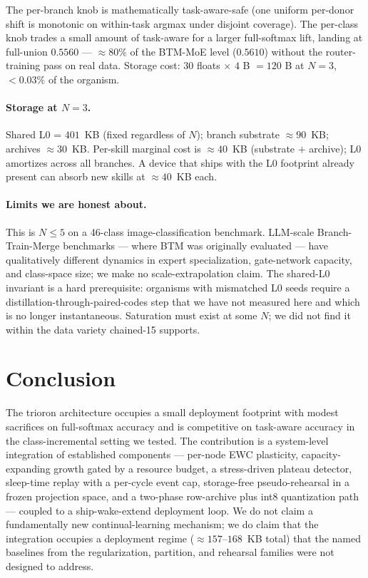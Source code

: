 \documentclass[11pt]{article}
\begin{document}
The per-branch knob is mathematically task-aware-safe (one uniform
per-donor shift is monotonic on within-task argmax under disjoint
coverage). The per-class knob trades a small amount of task-aware for
a larger full-softmax lift, landing at full-union $0.5560$ ---
$\approx 80\%$ of the BTM-MoE level ($0.5610$) without the
router-training pass on real data. Storage cost: $30$ floats $\times$
$4$ B $= 120$ B at $N = 3$, $<\!0.03\%$ of the organism.

\paragraph{Storage at $N = 3$.}
Shared L0 = $401$~KB (fixed regardless of $N$); branch substrate
$\approx 90$~KB; archives $\approx 30$~KB. Per-skill marginal cost is
$\approx 40$~KB (substrate $+$ archive); L0 amortizes across all
branches. A device that ships with the L0 footprint already present
can absorb new skills at $\approx 40$~KB each.

\paragraph{Limits we are honest about.}
This is $N \leq 5$ on a 46-class image-classification benchmark.
LLM-scale Branch-Train-Merge benchmarks --- where BTM was originally
evaluated --- have qualitatively different dynamics in expert
specialization, gate-network capacity, and class-space size; we
make no scale-extrapolation claim. The shared-L0 invariant is a hard
prerequisite: organisms with mismatched L0 seeds require a
distillation-through-paired-codes step that we have not measured here
and which is no longer instantaneous. Saturation must exist at some
$N$; we did not find it within the data variety chained-15 supports.


\section{Conclusion}
\label{sec:conclusion}

The trioron architecture occupies a small deployment footprint with
modest sacrifices on full-softmax accuracy and is competitive on
task-aware accuracy in the class-incremental setting we tested. The
contribution is a system-level integration of established components
--- per-node EWC plasticity, capacity-expanding growth gated by a
resource budget, a stress-driven plateau detector, sleep-time replay
with a per-cycle event cap, storage-free pseudo-rehearsal in a frozen
projection space, and a two-phase row-archive plus int8 quantization
path --- coupled to a ship-wake-extend deployment loop. We do not
claim a fundamentally new continual-learning mechanism; we do claim
that the integration occupies a deployment regime
($\approx 157$--$168$~KB total) that the named baselines from the
regularization, partition, and rehearsal families were not designed
to address.
\end{document}
